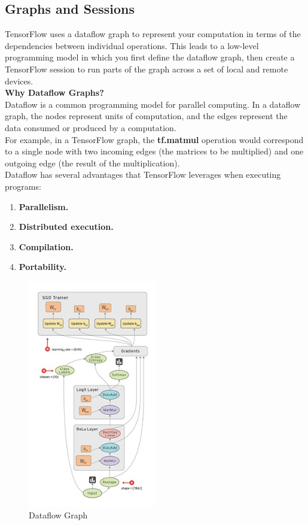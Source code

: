 \subsection{Graphs and Sessions}
TensorFlow uses a dataflow graph to represent your computation in terms of the dependencies between individual operations. This leads to a low-level programming model in which you first define the dataflow graph, then create a TensorFlow session to run parts of the graph across a set of local and remote devices.\\
  \textbf{Why Dataflow Graphs?}\\
  Dataflow is a common programming model for parallel computing. In a dataflow graph, the nodes represent units of computation, and the edges represent the data consumed or produced by a computation.\\
  For example, in a TensorFlow graph, the \textbf{tf.matmul} operation would correspond to a single node with two incoming edges (the matrices to be multiplied) and one outgoing edge (the result of the multiplication).\\
Dataflow has several advantages that TensorFlow leverages when executing programs:
\begin{enumerate}
      \item\textbf{Parallelism.}
\item\textbf{Distributed execution.}
\item\textbf{Compilation.}
\item\textbf{Portability.}
\end{enumerate}
\begin{figure}[H]%
    \center%
    \includegraphics[width=0.5\textwidth]{images/eman/Dataflow-graph.jpg}%
\caption[This is Dataflow Graph]{Dataflow Graph}\label{fig:graph}%
  \end{figure}

